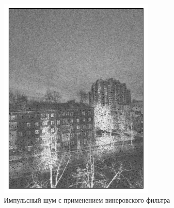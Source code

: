 \documentclass[a4paper,12pt]{article}
\begin{document}
\begin{figure}[H]
    \begin{minipage}{0.49\textwidth}
        \centering \includegraphics[width=\textwidth]{results/nlf_sap_6.png}
        \caption{Импульсный шум с применением винеровского фильтра}
    \end{minipage}\hfill
    \begin{minipage}{0.49\textwidth}

\end{minipage}
\end{figure}
\end{document}
